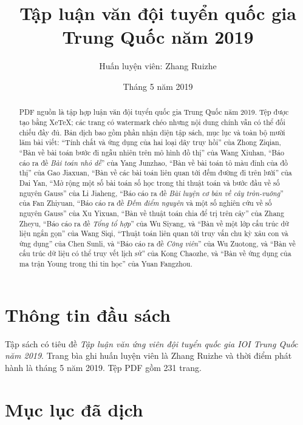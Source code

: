 \documentclass[11pt]{article}
\title{Tập luận văn đội tuyển quốc gia Trung Quốc năm 2019}
\author{Huấn luyện viên: Zhang Ruizhe}
\date{Tháng 5 năm 2019}
\begin{document}
\maketitle


\renewcommand{\abstractname}{Tóm tắt}
\renewcommand{\figurename}{Hình}
\begin{abstract}
PDF nguồn là tập hợp luận văn đội tuyển quốc gia Trung Quốc năm 2019. Tệp được
tạo bằng XeTeX; các trang có watermark chéo nhưng nội dung chính vẫn có thể
đối chiếu đầy đủ. Bản dịch bao gồm phần nhận diện tập sách, mục lục và toàn bộ
mười lăm bài
viết: ``Tính chất và ứng dụng của hai loại dãy truy hồi'' của Zhong Ziqian,
``Bàn về bài toán bước đi ngẫu nhiên trên mô hình đồ thị'' của Wang Xiuhan,
``Báo cáo ra đề \emph{Bài toán nhỏ dễ}'' của Yang Junzhao, ``Bàn về bài toán
tô màu đỉnh của đồ thị'' của Gao Jiaxuan, ``Bàn về các bài toán liên quan tới
đếm đường đi trên lưới'' của Dai Yan, ``Mở rộng một số bài toán số học trong
thi thuật toán và bước đầu về số nguyên Gauss'' của Li Jiaheng, ``Báo cáo ra
đề \emph{Bài luyện cơ bản về cây tròn-vuông}'' của Fan Zhiyuan, ``Báo cáo
ra đề \emph{Đếm điểm nguyên} và một số nghiên cứu về số nguyên Gauss'' của Xu
Yixuan, ``Bàn về thuật toán chia để trị trên cây'' của Zhang Zheyu, ``Báo cáo
ra đề \emph{Tổng tổ hợp}'' của Wu Siyang, và ``Bàn về một lớp cấu trúc dữ liệu
ngắn gọn'' của Wang Siqi, ``Thuật toán liên quan tới truy vấn chu kỳ xâu con
và ứng dụng'' của Chen Sunli, và ``Báo cáo ra đề \emph{Công viên}'' của Wu
Zuotong, và ``Bàn về cấu trúc dữ liệu có thể truy vết lịch sử'' của Kong
Chaozhe, và ``Bàn về ứng dụng của ma trận Young trong thi tin học'' của Yuan
Fangzhou.
\end{abstract}

\section{Thông tin đầu sách}

Tập sách có tiêu đề \emph{Tập luận văn ứng viên đội tuyển quốc gia IOI Trung
Quốc năm 2019}. Trang bìa ghi huấn luyện viên là Zhang Ruizhe và thời điểm
phát hành là tháng 5 năm 2019. Tệp PDF gồm 231 trang.

\section{Mục lục đã dịch}
\end{document}
